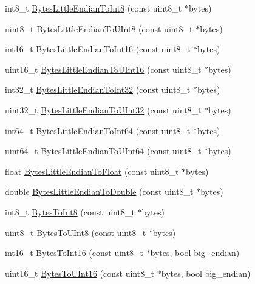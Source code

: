 \begin{DoxyCompactItemize}
\item 
int8\+\_\+t \hyperlink{namespacemage_a083a2ea889a770925db23c1f514454d9}{Bytes\+Little\+Endian\+To\+Int8} (const uint8\+\_\+t $\ast$bytes)
\item 
uint8\+\_\+t \hyperlink{namespacemage_ac06182df9bf408e6de663497d9760724}{Bytes\+Little\+Endian\+To\+U\+Int8} (const uint8\+\_\+t $\ast$bytes)
\item 
int16\+\_\+t \hyperlink{namespacemage_ac391c9723ff006ce3e3f824108dbcc61}{Bytes\+Little\+Endian\+To\+Int16} (const uint8\+\_\+t $\ast$bytes)
\item 
uint16\+\_\+t \hyperlink{namespacemage_aca75f80f9445dd764414522db4967336}{Bytes\+Little\+Endian\+To\+U\+Int16} (const uint8\+\_\+t $\ast$bytes)
\item 
int32\+\_\+t \hyperlink{namespacemage_ad3cd4209c8a542d2196091a4753a58b3}{Bytes\+Little\+Endian\+To\+Int32} (const uint8\+\_\+t $\ast$bytes)
\item 
uint32\+\_\+t \hyperlink{namespacemage_a453e851f136573bfc7839157786472a4}{Bytes\+Little\+Endian\+To\+U\+Int32} (const uint8\+\_\+t $\ast$bytes)
\item 
int64\+\_\+t \hyperlink{namespacemage_ae242f13f851ffa9c73bdcb17902f6b57}{Bytes\+Little\+Endian\+To\+Int64} (const uint8\+\_\+t $\ast$bytes)
\item 
uint64\+\_\+t \hyperlink{namespacemage_ae6f54de05a834fbb34a75312479009ba}{Bytes\+Little\+Endian\+To\+U\+Int64} (const uint8\+\_\+t $\ast$bytes)
\item 
float \hyperlink{namespacemage_ae8c9922f140fd0f66a8dc71edca6ae0e}{Bytes\+Little\+Endian\+To\+Float} (const uint8\+\_\+t $\ast$bytes)
\item 
double \hyperlink{namespacemage_a1264a1a92902534e596430b67784869a}{Bytes\+Little\+Endian\+To\+Double} (const uint8\+\_\+t $\ast$bytes)
\item 
int8\+\_\+t \hyperlink{namespacemage_a1e911bf0ab208ddf9f1ca362db28069d}{Bytes\+To\+Int8} (const uint8\+\_\+t $\ast$bytes)
\item 
uint8\+\_\+t \hyperlink{namespacemage_af1f2745091f9580c028990d0f2848ebe}{Bytes\+To\+U\+Int8} (const uint8\+\_\+t $\ast$bytes)
\item 
int16\+\_\+t \hyperlink{namespacemage_a7db26a377fbab44bd501ccdb55a86067}{Bytes\+To\+Int16} (const uint8\+\_\+t $\ast$bytes, bool big\+\_\+endian)
\item 
uint16\+\_\+t \hyperlink{namespacemage_ae7ac42dd62471c5badcd2f6c49b30e5b}{Bytes\+To\+U\+Int16} (const uint8\+\_\+t $\ast$bytes, bool big\+\_\+endian)

\end{DoxyCompactItemize}
